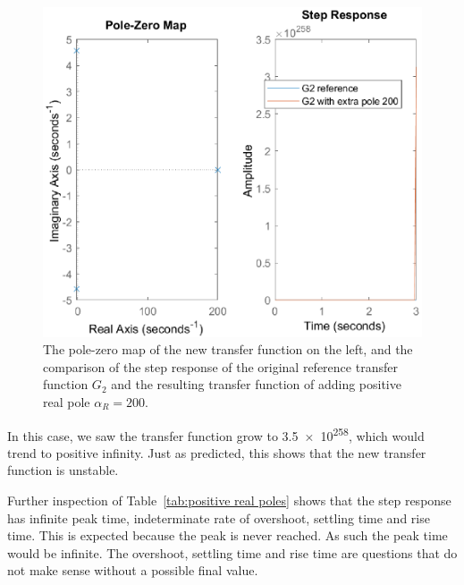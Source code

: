 \documentclass[12pt]{article}
\begin{document}
\begin{figure}
    \centering
    \includegraphics{img/part02_positive_real_pole.eps}
    \caption{The pole-zero map of the new transfer function on the left, and the comparison of the step response of the original reference transfer function $G_2$ and the resulting transfer function of adding positive real pole $\alpha_R = 200$.}
    \label{fig:nonpositive real poles}
\end{figure}

In this case, we saw the transfer function grow to \num{3.5e+258}, which would trend to positive infinity. Just as predicted, this shows that the new transfer function is unstable.

Further inspection of Table~\ref{tab:positive real poles} shows that the step response has infinite peak time, indeterminate rate of overshoot, settling time and rise time. This is expected because the peak is never reached. As such the peak time would be infinite. The overshoot, settling time and rise time are questions that do not make sense without a possible final value.
\end{document}

